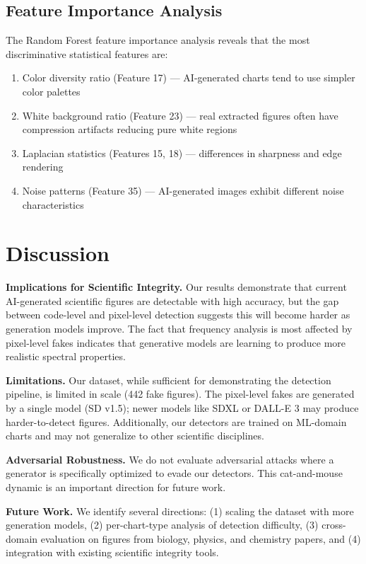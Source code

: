 \documentclass[11pt]{article}
\begin{document}
\subsection{Feature Importance Analysis}

The Random Forest feature importance analysis reveals that the most discriminative statistical features are:
\begin{enumerate}
    \item Color diversity ratio (Feature 17) --- AI-generated charts tend to use simpler color palettes
    \item White background ratio (Feature 23) --- real extracted figures often have compression artifacts reducing pure white regions
    \item Laplacian statistics (Features 15, 18) --- differences in sharpness and edge rendering
    \item Noise patterns (Feature 35) --- AI-generated images exhibit different noise characteristics
\end{enumerate}

\section{Discussion}

\textbf{Implications for Scientific Integrity.} Our results demonstrate that current AI-generated scientific figures are detectable with high accuracy, but the gap between code-level and pixel-level detection suggests this will become harder as generation models improve. The fact that frequency analysis is most affected by pixel-level fakes indicates that generative models are learning to produce more realistic spectral properties.

\textbf{Limitations.} Our dataset, while sufficient for demonstrating the detection pipeline, is limited in scale (442 fake figures). The pixel-level fakes are generated by a single model (SD v1.5); newer models like SDXL or DALL-E 3 may produce harder-to-detect figures. Additionally, our detectors are trained on ML-domain charts and may not generalize to other scientific disciplines.

\textbf{Adversarial Robustness.} We do not evaluate adversarial attacks where a generator is specifically optimized to evade our detectors. This cat-and-mouse dynamic is an important direction for future work.

\textbf{Future Work.} We identify several directions: (1) scaling the dataset with more generation models, (2) per-chart-type analysis of detection difficulty, (3) cross-domain evaluation on figures from biology, physics, and chemistry papers, and (4) integration with existing scientific integrity tools.
\end{document}
